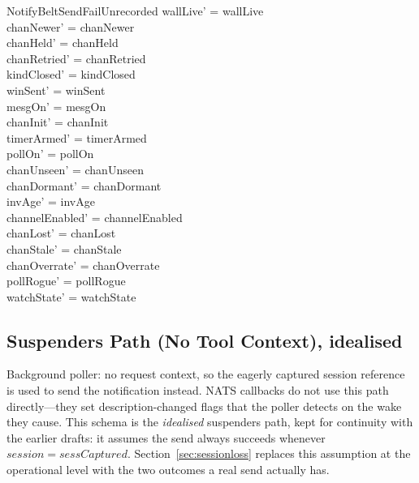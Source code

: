 \documentclass[a4paper,10pt,fleqn]{article}
\begin{document}
\begin{schema}{NotifyBeltSendFailUnrecorded}
  wallLive' = wallLive \\
  chanNewer' = chanNewer \\
  chanHeld' = chanHeld \\
  chanRetried' = chanRetried \\
  kindClosed' = kindClosed \\
  winSent' = winSent \\
  mesgOn' = mesgOn \\
  chanInit' = chanInit \\
  timerArmed' = timerArmed \\
  pollOn' = pollOn \\
  chanUnseen' = chanUnseen \\
  chanDormant' = chanDormant \\
  invAge' = invAge \\
  channelEnabled' = channelEnabled \\
  chanLost' = chanLost \\
  chanStale' = chanStale \\
  chanOverrate' = chanOverrate \\
  pollRogue' = pollRogue \\
  watchState' = watchState
\end{schema}

\subsection{Suspenders Path (No Tool Context), idealised}

Background poller: no request context, so the eagerly captured
session reference is used to send the notification instead.  NATS
callbacks do not use this path directly---they set description-changed
flags that the poller detects on the wake they cause.  This schema is the
\emph{idealised} suspenders path, kept for continuity with the earlier
drafts: it assumes the send always succeeds whenever
$session = sessCaptured$.  Section~\ref{sec:sessionloss} replaces this
assumption at the operational level with the two outcomes a real send
actually has.
\end{document}
